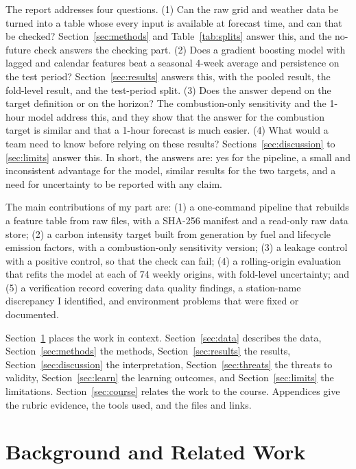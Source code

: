 \documentclass[10pt,journal,compsoc]{IEEEtran}
\begin{document}
The report addresses four questions. (1) Can the raw grid and weather data be turned into a table whose every input is available at forecast time, and can that be checked? Section~\ref{sec:methods} and Table~\ref{tab:splits} answer this, and the no-future check answers the checking part. (2) Does a gradient boosting model with lagged and calendar features beat a seasonal 4-week average and persistence on the test period? Section~\ref{sec:results} answers this, with the pooled result, the fold-level result, and the test-period split. (3) Does the answer depend on the target definition or on the horizon? The combustion-only sensitivity and the 1-hour model address this, and they show that the answer for the combustion target is similar and that a 1-hour forecast is much easier. (4) What would a team need to know before relying on these results? Sections~\ref{sec:discussion} to \ref{sec:limits} answer this. In short, the answers are: yes for the pipeline, a small and inconsistent advantage for the model, similar results for the two targets, and a need for uncertainty to be reported with any claim.

The main contributions of my part are: (1) a one-command pipeline that rebuilds a feature table from raw files, with a SHA-256 manifest and a read-only raw data store; (2) a carbon intensity target built from generation by fuel and lifecycle emission factors, with a combustion-only sensitivity version; (3) a leakage control with a positive control, so that the check can fail; (4) a rolling-origin evaluation that refits the model at each of 74 weekly origins, with fold-level uncertainty; and (5) a verification record covering data quality findings, a station-name discrepancy I identified, and environment problems that were fixed or documented.

Section~\ref{sec:related} places the work in context. Section~\ref{sec:data} describes the data, Section~\ref{sec:methods} the methods, Section~\ref{sec:results} the results, Section~\ref{sec:discussion} the interpretation, Section~\ref{sec:threats} the threats to validity, Section~\ref{sec:learn} the learning outcomes, and Section~\ref{sec:limits} the limitations. Section~\ref{sec:course} relates the work to the course. Appendices give the rubric evidence, the tools used, and the files and links.

\section{Background and Related Work}
\label{sec:related}
\end{document}
